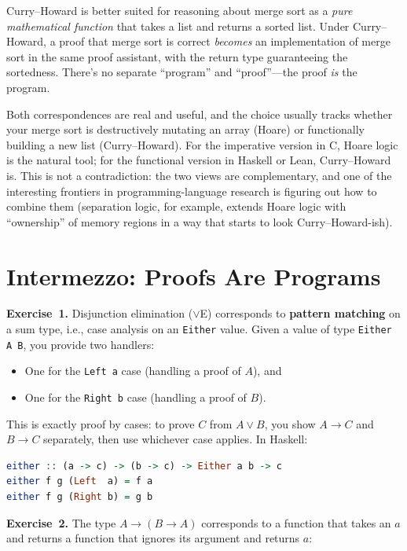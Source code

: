 \documentclass[11pt]{article}
\begin{document}
Curry--Howard is better suited for reasoning about merge sort as a \emph{pure mathematical function} that takes a list and returns a sorted list. Under Curry--Howard, a proof that merge sort is correct \emph{becomes} an implementation of merge sort in the same proof assistant, with the return type guaranteeing the sortedness. There's no separate ``program'' and ``proof''---the proof \emph{is} the program.

Both correspondences are real and useful, and the choice usually tracks whether your merge sort is destructively mutating an array (Hoare) or functionally building a new list (Curry--Howard). For the imperative version in C, Hoare logic is the natural tool; for the functional version in Haskell or Lean, Curry--Howard is. This is not a contradiction: the two views are complementary, and one of the interesting frontiers in programming-language research is figuring out how to combine them (separation logic, for example, extends Hoare logic with ``ownership'' of memory regions in a way that starts to look Curry--Howard-ish).

\section*{Intermezzo: Proofs Are Programs}

\textbf{Exercise~1.}
Disjunction elimination ($\vee$E) corresponds to \textbf{pattern
matching} on a sum type, i.e., case analysis on an \texttt{Either}
value.  Given a value of type \texttt{Either A B}, you provide two
handlers:
\begin{itemize}
  \item One for the \texttt{Left a} case (handling a proof of $A$), and
  \item One for the \texttt{Right b} case (handling a proof of $B$).
\end{itemize}
This is exactly proof by cases: to prove $C$ from $A \vee B$, you show
$A \to C$ and $B \to C$ separately, then use whichever case applies.
In Haskell:

\begin{lstlisting}[language=Haskell]
either :: (a -> c) -> (b -> c) -> Either a b -> c
either f g (Left  a) = f a
either f g (Right b) = g b
\end{lstlisting}

\medskip
\textbf{Exercise~2.}
The type $A \to (B \to A)$ corresponds to a function that takes an $a$
and returns a function that ignores its argument and returns $a$:
\end{document}
